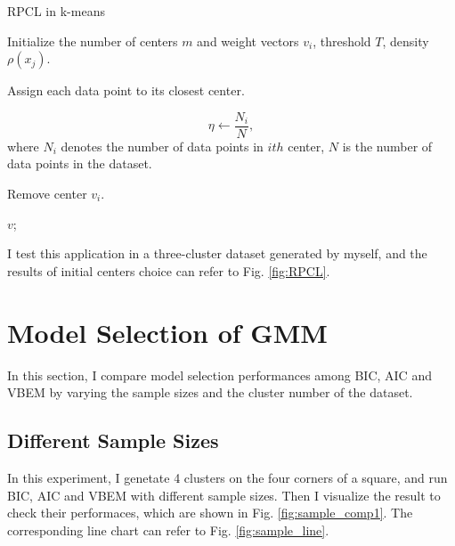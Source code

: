\documentclass[12pt,a4paper]{article}
\theoremstyle{definition}
\begin{document}
\begin{algorithm}[H]
	\caption{RPCL in k-means}
	\label{alg:RPCL}
	\vspace{0.25\baselineskip}
	
	Initialize the number of centers $m$ and weight vectors $v_{i}$, threshold $T$, density $\rho(x_{j})$.
	
	 {
	}
	
	Assign each data point to its closest center.
	
	 {
		\begin{equation*}
			\eta \leftarrow \dfrac{N_{i}}{N},
		\end{equation*}
		where $N_{i}$ denotes the number of data points in $ith$ center, $N$ is the number of data points in the dataset.
		
		 {
			Remove center $v_{i}$.
		}
	}

	\Return $v$;
\end{algorithm}

I test this application in a three-cluster dataset generated by myself, and the results of initial centers choice can refer to Fig. \ref{fig:RPCL}.
\section{Model Selection of GMM}

In this section, I compare model selection performances among BIC, AIC and VBEM by varying the sample sizes and the cluster number of the dataset.

\subsection{Different Sample Sizes}

In this experiment, I genetate 4 clusters on the four corners of a square, and run BIC, AIC and VBEM with different sample sizes. Then I visualize the result to check their performaces, which are shown in Fig. \ref{fig:sample_comp1}. The corresponding line chart can refer to Fig. \ref{fig:sample_line}.
\end{document}
